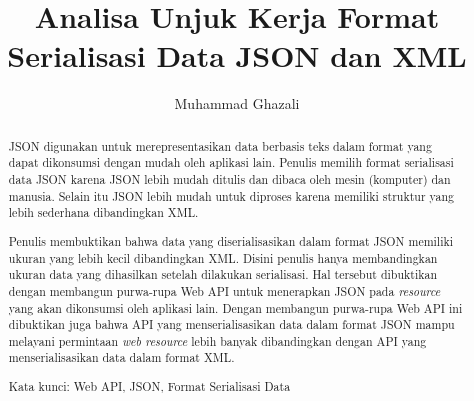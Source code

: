 \documentclass{llncs}
\begin{document}
\title{Analisa Unjuk Kerja Format Serialisasi Data JSON dan XML}




\author{Muhammad Ghazali}







\maketitle

\begin{abstract}

\onehalfspacing JSON digunakan untuk merepresentasikan data berbasis teks dalam format yang dapat dikonsumsi dengan mudah oleh aplikasi lain. Penulis memilih format serialisasi data JSON karena JSON lebih mudah ditulis dan dibaca oleh mesin (komputer) dan manusia. Selain itu JSON lebih mudah untuk diproses karena memiliki struktur yang lebih sederhana dibandingkan XML\cite{json-fat-free}\cite{json-vs-xml-debate}.

\onehalfspacing Penulis membuktikan bahwa data yang diserialisasikan dalam format JSON memiliki ukuran yang lebih kecil dibandingkan XML. Disini penulis hanya membandingkan ukuran data yang dihasilkan setelah dilakukan serialisasi. Hal tersebut dibuktikan dengan membangun purwa-rupa Web API untuk menerapkan JSON pada \textit{resource} yang akan dikonsumsi oleh aplikasi lain. Dengan membangun purwa-rupa Web API ini dibuktikan juga bahwa API yang menserialisasikan data dalam format JSON mampu melayani permintaan \textit{web resource} lebih banyak dibandingkan dengan API yang menserialisasikan data dalam format XML.

Kata kunci: Web API, JSON, Format Serialisasi Data
\end{abstract}
\end{document}
